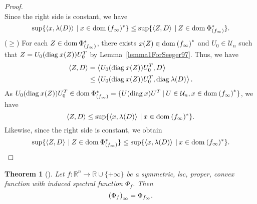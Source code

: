\documentclass[a4paper,11pt, oneside]{book}
\newtheorem{thm}{Theorem}[section]
\theoremstyle{definition}
\newcommand{\RealNumberSet}{\mathbb{R}}
\newcommand{\NDemenstionalRealEuclideanSpace}{\mathbb{R}^n}
\newcommand{\NDemenstionalRealOthonormalMatrixSpace}{\mathcal{U}_n}
\newcommand{\Domain}[1]{\text{\rm dom\:${#1}$}} %
\newcommand{\Diagnosis}[1]{\text{\rm diag\:${#1}$}} %
\newcommand{\InnerProduct}[2]{\left\langle {#1},{#2}\right\rangle} %
\newcommand{\ExtendedRealValuedFunction}[2]{{#1}: {#2} \to \RealNumberSet \cup \{+\infty\}}
\newcommand{\ConjugateFunction}[1]{{#1}^*}
\newcommand{\SetForm}[2]{
  \{{#1}\:|\:{#2}\}
}
\begin{document}
\begin{proof}
\begin{equation}
  \end{equation}
  Since the right side is constant, we have
  \begin{equation}
    \sup \{\InnerProduct{x}{\lambda(D)}\:|\:x\in\Domain{(f_{\infty})^*}\} \leq
    \sup \{\InnerProduct{Z}{D} \:|\: Z \in \Domain{\Phi^*_{(f_{\infty})}}\}. \notag
  \end{equation}
  ($\geq$) For each $Z \in \Domain{\Phi^*_{(f_{\infty})}}$, there exists $x(Z) \in \Domain{\ConjugateFunction{(f_{\infty})}}$ and $U_0 \in \NDemenstionalRealOthonormalMatrixSpace$ such that $Z= U_0(\Diagnosis{x(Z)})U_0^T$ by Lemma~\ref{lemma1ForSeeger97}. Thus, we have
  \begin{equation}
    \begin{split}
      \InnerProduct{Z}{D} &= \InnerProduct{U_0(\Diagnosis{x(Z)})U_0^T}{D} \\
      &\leq \InnerProduct{U_0(\Diagnosis{x(Z)})U_0^T}{\Diagnosis{\lambda(D)}}. \notag
    \end{split}
  \end{equation}
  As $U_0(\Diagnosis{x(Z)})U_0^T \in \Domain{\Phi^*_{(f_{\infty})}} = \SetForm{U (\Diagnosis{x}) U^T}{U \in \NDemenstionalRealOthonormalMatrixSpace, x \in \Domain{\ConjugateFunction{(f_{\infty})}}}$, we have
  \begin{equation}
    \InnerProduct{Z}{D} \leq \sup \{\InnerProduct{x}{\lambda(D)}\:|\:x\in\Domain{(f_{\infty})^*}\}. \notag
  \end{equation}
  Likewise, since the right side is constant, we obtain
  \begin{equation}
    \sup \{\InnerProduct{Z}{D} \:|\: Z \in \Domain{\Phi^*_{(f_{\infty})}}\} \leq
    \sup \{\InnerProduct{x}{\lambda(D)}\:|\:x\in\Domain{(f_{\infty})^*}\}. \notag
  \end{equation}
\end{proof}

\begin{thm}[\mbox{\cite[Seeger (1997)]{Seeger97}}]\label{Seeger97}
  Let $\ExtendedRealValuedFunction{f}{\NDemenstionalRealEuclideanSpace}$ be a symmetric, lsc, proper, convex function with induced spectral function $\Phi_{f}$. Then
  \begin{equation}
    {(\Phi_{f})}_{\infty} = \Phi_{f_{\infty}}. \notag
  \end{equation}
\end{thm}
\end{document}
